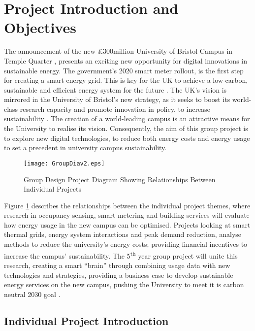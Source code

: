 \section{Project Introduction and
Objectives}\label{project-introduction-and-objectives}

The announcement of the new £300million University of Bristol Campus in
Temple Quarter \cite{November58:online}, presents an exciting new
opportunity for digital innovations in sustainable energy. The
government's 2020 smart meter rollout, is the first step for creating a
smart energy grid. This is key for the UK to achieve a low-carbon,
sustainable and efficient energy system for the future
\cite{SmartEne79:online}. The UK's vision is mirrored in the University
of Bristol's new strategy, as it seeks to boost its world-class research
capacity and promote innovation in policy, to increase sustainability
\cite{universi93:online}. The creation of a world-leading campus is an
attractive means for the University to realise its vision. Consequently,
the aim of this group project is to explore new digital technologies, to
reduce both energy costs and energy usage to set a precedent in
university campus sustainability.

\begin{figure}[H]
\centering
\texttt{[image: GroupDiav2.eps]}
\caption{Group Design Project Diagram Showing Relationships Between Individual Projects}
\vspace{-20pt}
\label{groupDia}
\end{figure}

Figure \ref{groupDia} describes the relationships between the individual
project themes, where research in occupancy sensing, smart metering and
building services will evaluate how energy usage in the new campus can
be optimised. Projects looking at smart thermal grids, energy system
interactions and peak demand reduction, analyse methods to reduce the
university's energy costs; providing financial incentives to increase
the campus' sustainability. The 5\textsuperscript{th} year group project
will unite this research, creating a smart ``brain'' \cite{pbmeet}
through combining usage data with new technologies and strategies,
providing a business case to develop sustainable energy services on the
new campus, pushing the University to meet it is carbon neutral 2030
goal \cite{universi93:online}.

\subsection{Individual Project
Introduction}\label{individual-project-introduction}

